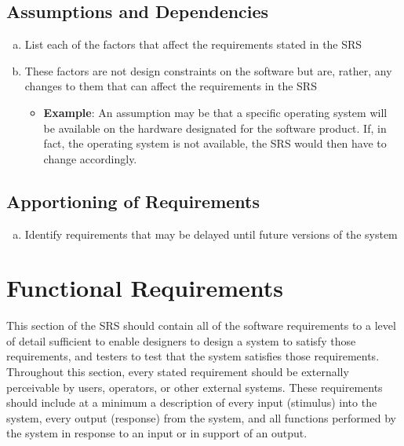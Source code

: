\documentclass[]{article}
\begin{document}
\subsection{Assumptions and Dependencies}
\label{sub:assumptions_and_dependencies}
\begin{enumerate}[a)]
	\item List each of the factors that affect the requirements stated in the SRS
	\item These factors are not design constraints on the software but are, rather, 
any changes to them that can affect the requirements in the SRS
	\begin{itemize}
		\item \textbf{Example}: An assumption may be that a specific operating system 
will be available on the hardware designated for the software product. If, in 
fact, the operating system is not available, the SRS would then have to change 
accordingly.
	\end{itemize}
\end{enumerate}

\subsection{Apportioning of Requirements}
\label{sub:apportioning_of_requirements}
\begin{enumerate}[a)]
	\item Identify requirements that may be delayed until future versions of the 
system
\end{enumerate}


\section{Functional Requirements}
\label{sec:functional_requirements}
This section of the SRS should contain all of the software requirements to a 
level of detail sufficient to enable designers to design a system to satisfy 
those requirements, and testers to test that the system satisfies those 
requirements. Throughout this section, every stated requirement should be 
externally perceivable by users, operators, or other external systems. These 
requirements should include at a minimum a description of every input (stimulus) 
into the system, every output (response) from the system, and all functions 
performed by the system in response to an input or in support of an output.
\end{document}
